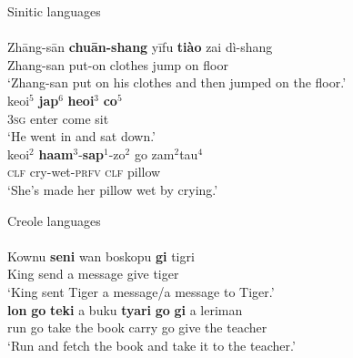 \ea
Sinitic languages\\
\ea \label{Man01}
\\
\gll Zhāng-sān \textbf{chuān-shang} yīfu \textbf{tiào} zai dì-shang\\
Zhang-san put-on clothes jump on floor\\
\glt ‘Zhang-san put on his clothes and then jumped on the floor.’
\ex \label{Can01}
\\
\gll keoi$^5$ \textbf{jap$^6$} \textbf{heoi$^3$} \textbf{co$^5$}\\
\textsc{3}\textsc{sg} enter come sit\\
\glt ‘He went in and sat down.’
\ex \label{Can02}
\\
\gll keoi$^2$ \textbf{haam$^3$}-\textbf{sap$^1$}-zo$^2$ go zam$^2$tau$^4$\\
\textsc{clf} cry-wet-\textsc{prfv} \textsc{clf} pillow\\
\glt ‘She's made her pillow wet by crying.’
\z
\z

\ea
Creole languages\\
\ea \label{Sra01}
\\
\gll Kownu \textbf{seni} wan boskopu \textbf{gi} tigri\\
King send a message give tiger\\
\glt ‘King sent Tiger a message/a message to Tiger.’
\ex \label{Sra02}
\\
\gll \textbf{lon} \textbf{go} \textbf{teki} a buku \textbf{tyari} \textbf{go} \textbf{gi} a leriman\\
run go take the book carry go give the teacher\\
\glt ‘Run and fetch the book and take it to the teacher.’
\z
\z

